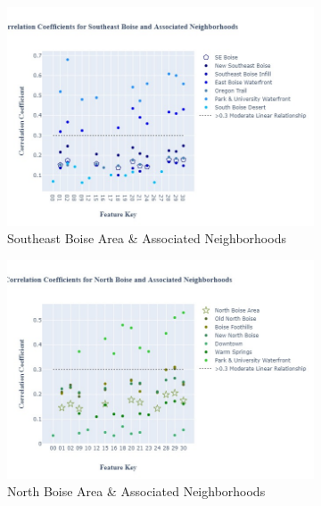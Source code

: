 \documentclass{article}
\begin{document}
\begin{figure}[H]
\begin{subfigure}[b]{0.45\textwidth}
         \includegraphics[width=\textwidth]{SEB_fig.jpg}
         \caption{Southeast Boise Area \& Associated Neighborhoods}
         \label{fig: se_cc}
     \end{subfigure}
          \begin{subfigure}[b]{0.45\textwidth}
         \centering
         \includegraphics[width=\textwidth]{NB_fig.jpg}
         \caption{North Boise Area \& Associated Neighborhoods}
         \label{fig: nb_cc}
     \end{subfigure}
               \begin{subfigure}[b]{0.45\textwidth}
         \centering

\end{subfigure}
\end{figure}
\end{document}
